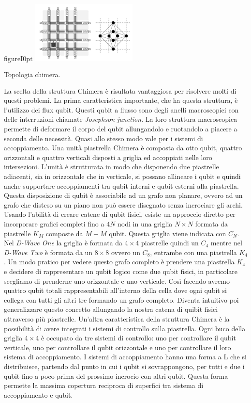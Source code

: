 \begin{wrapfloat}{figure}{I}{0pt}
\includegraphics[width=0.4\textwidth]{Immagini/chimera.jpg}
\caption{Topologia chimera.}
\label{figura:chimera}
\end{wrapfloat}
\cite{ACI}La scelta della struttura Chimera è risultata vantaggiosa per risolvere molti di questi problemi. La prima caratteristica importante, che ha questa struttura, è l'utilizzo dei flux qubit. Questi qubit a flusso sono degli anelli macroscopici con delle interruzioni chiamate \textit{Josephson junction}. La loro struttura macroscopica permette di deformare il corpo del qubit allungandolo e ruotandolo a piacere a seconda delle necessità. Quasi allo stesso modo vale per i sistemi di accoppiamento. Una unità piastrella Chimera è composta da otto qubit, quattro orizzontali e quattro verticali disposti a griglia ed accoppiati nelle loro intersezioni. L'unità è strutturata in modo che disponendo due piastrelle adiacenti, sia in orizzontale che in verticale, si possano allineare i qubit e quindi anche supportare accoppiamenti tra qubit interni e qubit esterni alla piastrella. Questa disposizione di qubit è associabile ad un grafo non planare, ovvero ad un grafo che disteso su un piano non può essere disegnato senza incrociare gli archi.
Usando l'abilità di creare catene di qubit fisici, esiste un approccio diretto per incorporare grafici completi fino a $4N$ nodi in una griglia $N \times N$ formata da piastrelle $K_M$ composte da $M + M$ qubit. Questa griglia viene indicata con $C_N$. Nel \textit{D-Wave One} la griglia è formata da $4\times4$ piastrelle quindi un $C_4$ mentre nel \textit{D-Wave Two} è formata da un $8\times8$ ovvero un $C_8$, entrambe con una piastrella $K_4$. Un modo pratico per vedere questo grafo completo è prendere una piastrella $K_4$ e decidere di rappresentare un qubit logico come due qubit fisici, in particolare scegliamo di prenderne uno orizzontale e uno verticale. Così facendo avremo quattro qubit totali rappresentabili all'interno della cella dove ogni qubit si collega con tutti gli altri tre formando un grafo completo. Diventa intuitivo poi generalizzare questo concetto allungando la nostra catena di quibit fisici attraverso più piastrelle. Un'altra caratteristica della struttura Chimera è la possibilità di avere integrati i sistemi di controllo sulla piastrella. Ogni buco della griglia $4\times4$ è occupato da tre sistemi di controllo: uno per controllare il qubit verticale, uno per controllare il qubit orizzontale e uno per controllare il loro sistema di accoppiamento. I sistemi di accoppiamento hanno una forma a L che si distribuisce, partendo dal punto in cui i qubit si sovrappongono, per tutti e due i qubit fino a poco prima del prossimo incrocio con altri qubit. Questa forma permette la massima copertura reciproca di superfici tra sistema di accoppiamento e qubit.
